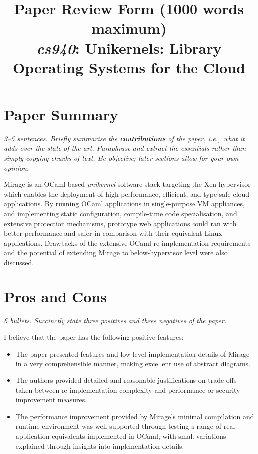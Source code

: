 \documentclass[11pt]{article}
\begin{document}
\title{Paper Review Form (1000 words maximum)\\
  \emph{cs940}: Unikernels: Library Operating Systems for the Cloud \cite{madhavapeddy2013unikernels}}
\maketitle

\section*{Paper Summary}
\textsl{3--5 sentences. Briefly summarise the {\bf contributions} of the paper, i.e.,~what it adds over the state of the art. Paraphrase and extract the essentials rather than simply copying chunks of text. Be objective; later sections allow for your own opinion.}

Mirage is an OCaml-based \emph{unikernel} software stack targeting the Xen hypervisor which enables the deployment of high performance, efficient, and type-safe cloud applications. By running OCaml applications in single-purpose VM appliances, and implementing static configuration, compile-time code specialisation, and extensive protection mechanisms, prototype web applications could ran with better performance and safer in comparison with their equivalent Linux applications. Drawbacks of the extensive OCaml re-implementation requirements and the potential of extending Mirage to below-hypervisor level were also discussed.

\section*{Pros and Cons}
\textsl{6 bullets. Succinctly state three positives and three negatives of the paper.}

I believe that the paper has the following positive features:
\begin{itemize}
	\item The paper presented features and low level implementation details of Mirage in a very comprehensible manner, making excellent use of abstract diagrams. 
	\item The authors provided detailed and reasonable justifications on trade-offs taken between re-implementation complexity and performance or security improvement measures.
	\item The performance improvement provided by Mirage's minimal compilation and runtime environment was well-supported through testing a range of real application equivalents implemented in OCaml, with small variations explained through insights into implementation details.
\end{itemize}
\end{document}
